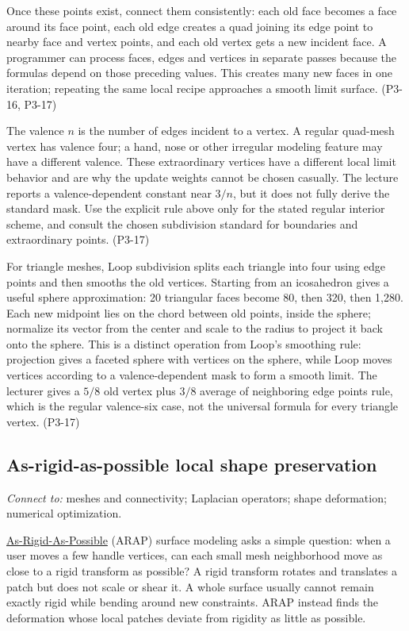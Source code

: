 Once these points exist, connect them consistently: each old face becomes a face around its face point, each old edge creates a quad joining its edge point to nearby face and vertex points, and each old vertex gets a new incident face. A programmer can process faces, edges and vertices in separate passes because the formulas depend on those preceding values. This creates many new faces in one iteration; repeating the same local recipe approaches a smooth limit surface. (P3-16, P3-17)

The valence \(n\) is the number of edges incident to a vertex. A regular quad-mesh vertex has valence four; a hand, nose or other irregular modeling feature may have a different valence. These extraordinary vertices have a different local limit behavior and are why the update weights cannot be chosen casually. The lecture reports a valence-dependent constant near \(3/n\), but it does not fully derive the standard mask. Use the explicit rule above only for the stated regular interior scheme, and consult the chosen subdivision standard for boundaries and extraordinary points. (P3-17)

For triangle meshes, Loop subdivision splits each triangle into four using edge points and then smooths the old vertices. Starting from an icosahedron gives a useful sphere approximation: 20 triangular faces become 80, then 320, then 1,280. Each new midpoint lies on the chord between old points, inside the sphere; normalize its vector from the center and scale to the radius to project it back onto the sphere. This is a distinct operation from Loop's smoothing rule: projection gives a faceted sphere with vertices on the sphere, while Loop moves vertices according to a valence-dependent mask to form a smooth limit. The lecturer gives a \(5/8\) old vertex plus \(3/8\) average of neighboring edge points rule, which is the regular valence-six case, not the universal formula for every triangle vertex. (P3-17)

\subsection{As-rigid-as-possible local shape preservation}\label{03-visual-computing-i-ch002-as-rigid-as-possible-local-shape-preservation}

\emph{Connect to:} meshes and connectivity; Laplacian operators; shape deformation; numerical optimization.

\hyperref[appendix-7107009c505b]{As-Rigid-As-Possible} (ARAP) surface modeling asks a simple question: when a user moves a few handle vertices, can each small mesh neighborhood move as close to a rigid transform as possible? A rigid transform rotates and translates a patch but does not scale or shear it. A whole surface usually cannot remain exactly rigid while bending around new constraints. ARAP instead finds the deformation whose local patches deviate from rigidity as little as possible.

